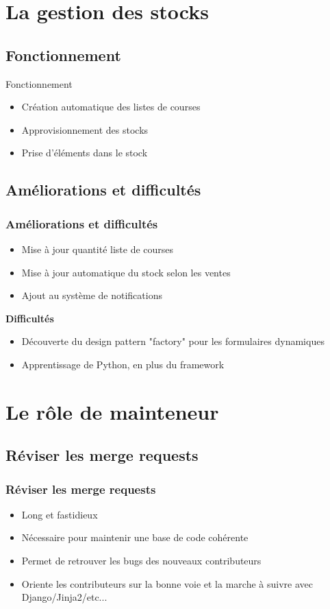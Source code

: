 \documentclass[10pt]{beamer}
\begin{document}
\section{La gestion des stocks}

\subsection{Fonctionnement}
\begin{frame}[fragile]{Fonctionnement}
    \begin{itemize}
        \item Création automatique des listes de courses
        \item Approvisionnement des stocks
        \item Prise d'éléments dans le stock
    \end{itemize}
\end{frame}

\subsection{Améliorations et difficultés}
\begin{frame}[fragile]\frametitle{Améliorations et difficultés}
    \begin{itemize}
        \item Mise à jour quantité liste de courses
        \item Mise à jour automatique du stock selon les ventes
        \item Ajout au système de notifications
    \end{itemize}
    \textbf{Difficultés}
    \begin{itemize}
        \item Découverte du design pattern "factory" pour les formulaires dynamiques
        \item Apprentissage de Python, en plus du framework
    \end{itemize}
\end{frame}

\section{Le rôle de mainteneur}

\subsection{Réviser les merge requests}
\begin{frame}[fragile]\frametitle{Réviser les merge requests}
    \begin{itemize}
        \item Long et fastidieux
        \item Nécessaire pour maintenir une base de code cohérente
        \item Permet de retrouver les bugs des nouveaux contributeurs
        \item Oriente les contributeurs sur la bonne voie et la marche à suivre avec Django/Jinja2/etc...
    \end{itemize}
\end{frame}
\end{document}
